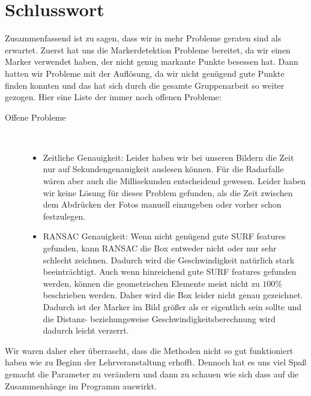 \documentclass[deutsch]{scrartcl}
\begin{document}

\section{Schlusswort}
Zusammenfassend ist zu sagen, dass wir in mehr Probleme geraten sind als erwartet. Zuerst hat uns die Markerdetektion Probleme bereitet, da wir einen Marker verwendet haben, der nicht genug markante Punkte besessen hat. Dann hatten wir Probleme mit der Auflösung, da wir nicht genügend gute Punkte finden konnten und das hat sich durch die gesamte Gruppenarbeit so weiter gezogen. Hier eine Liste der immer noch offenen Probleme:    

\begin{description}
	\item[Offene Probleme] ~\par
	\begin{itemize}
		\item Zeitliche Genauigkeit: Leider haben wir bei unseren Bildern die Zeit nur auf Sekundengenauigkeit auslesen können. Für die Radarfalle wären aber auch die Millisekunden entscheidend gewesen. Leider haben wir keine Lösung für dieses Problem gefunden, als die Zeit zwischen dem Abdrücken der Fotos manuell einzugeben oder vorher schon festzulegen.
		\item RANSAC Genauigkeit: Wenn nicht genügend gute SURF features gefunden, kann RANSAC die Box entweder nicht oder nur sehr schlecht zeichnen. Dadurch wird die Geschwindigkeit natürlich stark beeinträchtigt. Auch wenn hinreichend gute SURF features gefunden werden, können die geometrischen Elemente meist nicht zu $100\%$ beschrieben werden. Daher wird die Box leider nicht genau gezeichnet. Dadurch ist der Marker im Bild größer als er eigentlich sein sollte und die Distanz- beziehungsweise Geschwindigkeitsberechnung wird dadurch leicht verzerrt.
	\end{itemize}
\end{description}

Wir waren daher eher überrascht, dass die Methoden nicht so gut funktioniert haben wie zu Beginn der Lehrveranstaltung erhofft. Dennoch hat es uns viel Spaß gemacht die Parameter zu verändern und dann zu schauen wie sich dass auf die Zusammenhänge im Programm auswirkt.  




\nocite{*}

\end{document}
